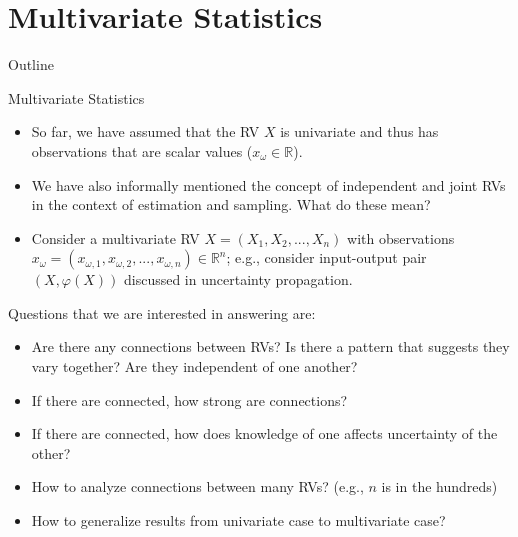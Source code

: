 \documentclass[9pt]{beamer}
\begin{document}
\section{Multivariate Statistics}
\begin{frame}{Outline}
\tableofcontents[currentsection]
\end{frame}

%
\begin{frame}{Multivariate Statistics}

\begin{itemize}
\item So far, we have assumed that the RV $X$ is univariate and thus has observations that are scalar values ($x_\omega \in \mathbb{R}$).  

\item We have also informally mentioned the concept of independent and joint RVs in the context of estimation and sampling.  What do these mean?

\item Consider a multivariate RV $X=(X_1,X_2,...,X_n)$ with observations $x_\omega=(x_{\omega,1},x_{\omega,2},...,x_{\omega,n})\in \mathbb{R}^n$; e.g., consider input-output pair $(X,\varphi(X))$ discussed in uncertainty propagation.
 
\end{itemize}

Questions that we are interested in answering are:
\begin{block}{}
\begin{itemize}
\item Are there any connections between RVs? Is there a pattern that suggests they vary together? Are they independent of one another?
\item If there are connected, how strong are connections?
\item If there are connected, how does knowledge of one affects uncertainty of the other? 
\item How to analyze connections between many RVs? (e.g., $n$ is in the hundreds)
\item How to generalize results from univariate case to multivariate case? 
\end{itemize}
\end{block}

\end{frame}
\end{document}
